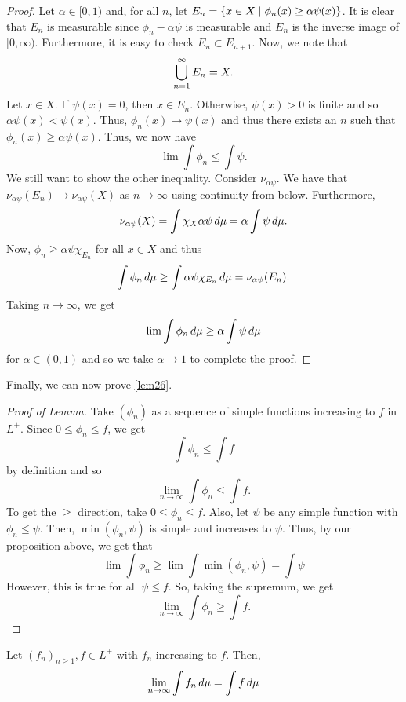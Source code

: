 \documentclass[11pt,leqno,oneside]{amsbook}
\numberwithin{thm}{section}
\begin{document}
\begin{proof}
  Let \(\alpha \in [0,1) \) and, for all \(n\), let \(E_n = \{x
  \in X \mid \phi_n(x) \geq \alpha \psi(x)\}\). It is clear that
  \(E_n\) is measurable since \(\phi_n - \alpha \psi\) is measurable
  and \(E_n\) is the inverse image of \([0,\infty) \). Furthermore, it
  is easy to check \(E_n \subset E_{n+1}\). Now, we note that \[
    \bigcup_{n=1}^\infty E_n = X.
  \]
  Let \(x \in X\). If \(\psi(x) = 0\), then \(x \in E_n\). Otherwise,
  \(\psi(x) > 0\) is finite and so \(\alpha \psi(x) < \psi(x)\). Thus,
  \(\phi_n(x) \to \psi(x)\) and thus there exists an \(n\) such that
  \(\phi_n(x) \geq \alpha \psi(x)\). Thus, we now have \[
    \lim \int \phi_n \leq \int \psi.
  \]
  We still want to show the other inequality. Consider \(\nu_{\alpha
    \psi}\). We have that \(\nu_{\alpha \psi}(E_n) \to \nu_{\alpha
    \psi}(X)\) as \(n \to \infty \) using continuity from
  below. Furthermore, \[
    \nu_{\alpha \psi}(X) = \int \chi_X \alpha \psi \, d\mu = \alpha \int
    \psi \, d\mu.
  \]
  Now, \(\phi_n \geq \alpha \psi \chi_{E_n}\) for all \(x \in X\) and
  thus \[
    \int \phi_n \, d\mu \geq \int \alpha \psi \chi_{E_n} \, d\mu = \nu_{\alpha \psi}(E_n).
  \]
  Taking \(n \to \infty\), we get \[
    \lim \int \phi_n \, d\mu \geq \alpha \int \psi \, d\mu
  \]
  for \(\alpha \in (0,1)\) and so we take \(\alpha \to 1\) to complete
  the proof.
\end{proof}
Finally, we can now prove \ref{lem26}.
\begin{proof}[Proof of Lemma]
  Take \((\phi_n)\) as a sequence of simple functions increasing to
  \(f\) in \(L^+\). Since \(0 \leq \phi_n \leq f\), we get \[
    \int \phi_n \leq \int f
  \]
  by definition and so \[
    \lim_{n \to \infty} \int \phi_n \leq \int f.
  \]
  To get the \(\geq\) direction, take \(0 \leq \phi_n \leq f\). Also,
  let \(\psi\) be any simple function with \(\phi_n \leq \psi\). Then,
  \(\min(\phi_n,\psi)\) is simple and increases to \(\psi\). Thus, by
  our proposition above, we get that \[
    \lim \int \phi_n \geq \lim \int \min(\phi_n,\psi) = \int \psi
  \]
  However, this is true for all \(\psi \leq f\). So, taking the supremum, we
  get \[
  \lim_{n \to \infty} \int \phi_n \geq \int f.
  \]
\end{proof}
\begin{thm}
  Let \((f_n)_{n \geq 1}, f \in L^+\) with \(f_n\) increasing to
  \(f\). Then, \[
    \lim_{n \to \infty} \int f_n \, d\mu = \int f \, d\mu
  \]
\end{thm}
\end{document}
